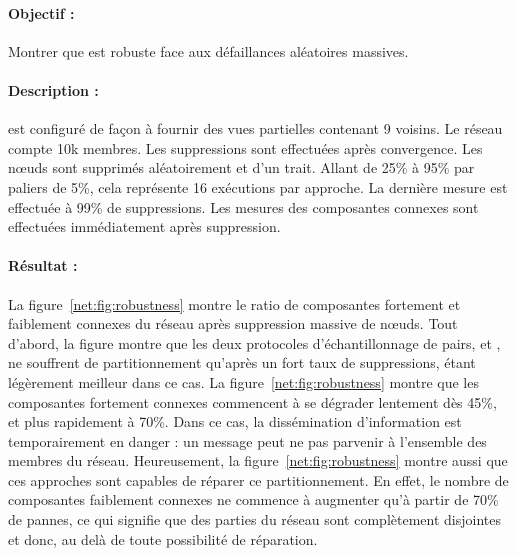 \paragraph{Objectif :} Montrer que \SPRAY est robuste face aux défaillances
aléatoires massives.

\paragraph{Description :} \CYCLON est configuré de façon à fournir des vues
partielles contenant 9 voisins. Le réseau compte 10k membres. Les suppressions
sont effectuées après convergence. Les nœuds sont supprimés aléatoirement et
d'un trait. Allant de 25\% à 95\% par paliers de 5\%, cela représente 16
exécutions par approche. La dernière mesure est effectuée à 99\% de
suppressions. Les mesures des composantes connexes sont effectuées immédiatement
après suppression.

\paragraph{Résultat :} La figure~\ref{net:fig:robustness} montre le ratio de
composantes fortement et faiblement connexes du réseau après suppression massive
de nœuds. Tout d'abord, la figure montre que les deux protocoles
d'échantillonnage de pairs, \SPRAY et \CYCLON, ne souffrent de partitionnement
qu'après un fort taux de suppressions, \CYCLON étant légèrement meilleur dans ce
cas. La figure~\ref{net:fig:robustness} montre que les composantes fortement
connexes commencent à se dégrader lentement dès 45\%, et plus rapidement à
70\%. Dans ce cas, la dissémination d'information est temporairement en danger
: un message peut ne pas parvenir à l'ensemble des membres du
réseau. Heureusement, la figure~\ref{net:fig:robustness} montre aussi que ces
approches sont capables de réparer ce partitionnement. En effet, le nombre de
composantes faiblement connexes ne commence à augmenter qu'à partir de 70\% de
pannes, ce qui signifie que des parties du réseau sont complètement disjointes
et donc, au delà de toute possibilité de réparation.


